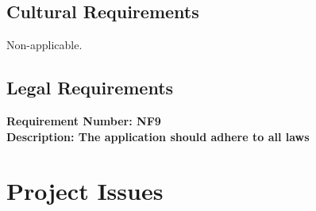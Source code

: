 \documentclass[12pt,fleqn]{article}
\begin{document}
\subsection {Cultural Requirements}
Non-applicable.
\subsection {Legal Requirements}
\begin{tcolorbox}
\textbf{Requirement Number: NF9} \\
\textbf{Description: The application should adhere to all laws} 
\end{tcolorbox}
\pagebreak


\section {Project Issues}
\end{document}
